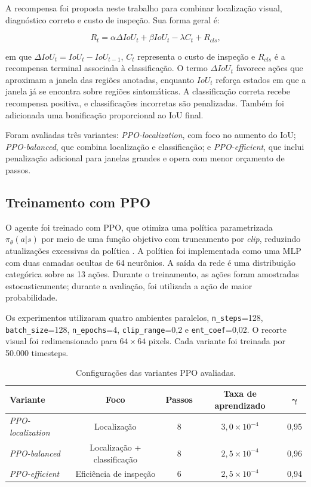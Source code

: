 A recompensa foi proposta neste trabalho para combinar localização visual, diagnóstico
correto e custo de inspeção. Sua forma geral é:

\begin{equation}
R_t = \alpha \Delta IoU_t + \beta IoU_t - \lambda C_t + R_{cls},
\end{equation}

\noindent em que $\Delta IoU_t = IoU_t - IoU_{t-1}$, $C_t$ representa o custo de
inspeção e $R_{cls}$ é a recompensa terminal associada à classificação. O termo
$\Delta IoU_t$ favorece ações que aproximam a janela das regiões anotadas, enquanto
$IoU_t$ reforça estados em que a janela já se encontra sobre regiões sintomáticas. A
classificação correta recebe recompensa positiva, e classificações incorretas são
penalizadas. Também foi adicionada uma bonificação proporcional ao IoU final.

Foram avaliadas três variantes: \textit{PPO-localization}, com foco no aumento do IoU;
\textit{PPO-balanced}, que combina localização e classificação; e
\textit{PPO-efficient}, que inclui penalização adicional para janelas grandes e opera
com menor orçamento de passos.

\subsection{Treinamento com PPO}

O agente foi treinado com PPO, que otimiza uma política parametrizada
$\pi_\theta(a|s)$ por meio de uma função objetivo com truncamento por \textit{clip},
reduzindo atualizações excessivas da política \cite{schulman2017ppo}. A política foi
implementada como uma MLP com duas camadas ocultas de 64 neurônios. A saída da rede é
uma distribuição categórica sobre as 13 ações. Durante o treinamento, as ações foram
amostradas estocasticamente; durante a avaliação, foi utilizada a ação de maior
probabilidade.

Os experimentos utilizaram quatro ambientes paralelos, \texttt{n\_steps}=128,
\texttt{batch\_size}=128, \texttt{n\_epochs}=4, \texttt{clip\_range}=0{,}2 e
\texttt{ent\_coef}=0{,}02. O recorte visual foi redimensionado para $64 \times 64$
pixels. Cada variante foi treinada por 50.000 timesteps.

\begin{table}[htbp]
\centering
\caption{Configurações das variantes PPO avaliadas.}
\label{tab:ppo_variants}
\begin{tabular}{lcccc}
\hline
\textbf{Variante} & \textbf{Foco} & \textbf{Passos} & \textbf{Taxa de aprendizado} & $\boldsymbol{\gamma}$ \\
\hline
\textit{PPO-localization} & Localização & 8 & $3{,}0 \times 10^{-4}$ & 0{,}95 \\
\textit{PPO-balanced} & Localização + classificação & 8 & $2{,}5 \times 10^{-4}$ & 0{,}96 \\
\textit{PPO-efficient} & Eficiência de inspeção & 6 & $2{,}5 \times 10^{-4}$ & 0{,}94 \\
\hline
\end{tabular}
\end{table}

